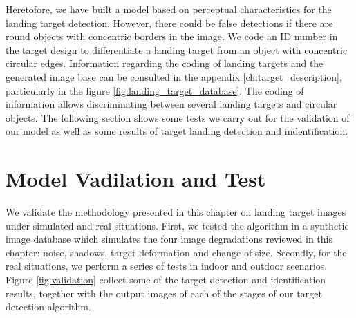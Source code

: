 Heretofore, we have built a model based on perceptual characteristics for the landing target detection. However, there could be false detections if there are round objects with concentric borders in the image. We code an ID number in the target design to differentiate a landing target from an object with concentric circular edges. Information regarding the coding of landing targets and the generated image base can be consulted in the appendix \ref{ch:target_description}, particularly in the figure \ref{fig:landing_target_database}. The coding of information allows discriminating between several landing targets and circular objects. The following section shows some tests we carry out for the validation of our model as well as some results of target landing detection and indentification. 

\section{Model Vadilation and Test}\label{sec:validation_and_test}
We validate the methodology presented in this chapter on landing target images under simulated and real situations. First, we tested the algorithm in a synthetic image database which simulates the four image degradations reviewed in this chapter: noise, shadows, target deformation and change of size. Secondly, for the real situations, we perform a series of tests in indoor and outdoor scenarios. Figure \ref{fig:validation} collect some of the target detection and identification results, together with the output images of each of the stages of our target detection algorithm. 

